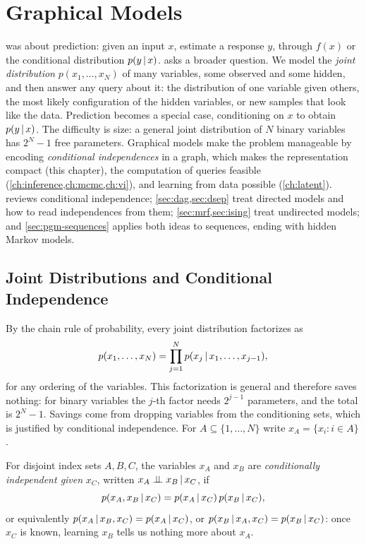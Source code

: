 \chapter{Graphical Models}\label{ch:pgm}

 was about prediction: given an input $x$, estimate a response $y$, through $f(x)$ or the conditional distribution $p(y\,|\, x)$.  asks a broader question. We model the \emph{joint distribution} $p(x_1,\dots,x_N)$ of many variables, some observed and some hidden, and then answer any query about it: the distribution of one variable given others, the most likely configuration of the hidden variables, or new samples that look like the data. Prediction becomes a special case, conditioning on $x$ to obtain $p(y\,|\, x)$. The difficulty is size: a general joint distribution of $N$ binary variables has $2^N-1$ free parameters. Graphical models make the problem manageable by encoding \emph{conditional independences} in a graph, which makes the representation compact (this chapter), the computation of queries feasible (\cref{ch:inference,ch:mcmc,ch:vi}), and learning from data possible (\cref{ch:latent}).  reviews conditional independence; \cref{sec:dag,sec:dsep} treat directed models and how to read independences from them; \cref{sec:mrf,sec:ising} treat undirected models; and \cref{sec:pgm-sequences} applies both ideas to sequences, ending with hidden Markov models.

\section{Joint Distributions and Conditional Independence}\label{sec:pgm-joint}

By the chain rule of probability, every joint distribution factorizes as
\[
p(x_1,\dots,x_N)=\prod_{j=1}^Np(x_j\,|\, x_1,\dots,x_{j-1}),
\]
for any ordering of the variables. This factorization is general and therefore saves nothing: for binary variables the $j$-th factor needs $2^{j-1}$ parameters, and the total is $2^N-1$. Savings come from dropping variables from the conditioning sets, which is justified by conditional independence. For $A\subseteq\{1,\dots,N\}$ write $x_A=\{x_i:i\in A\}$.

\begin{definition}\label{def:cond-indep}
For disjoint index sets $A,B,C$, the variables $x_A$ and $x_B$ are \emph{conditionally independent given} $x_C$, written $x_A\perp\!\!\!\perp x_B\,|\, x_C$, if
\[
p(x_A,x_B\,|\, x_C)=p(x_A\,|\, x_C)\,p(x_B\,|\, x_C),
\]
or equivalently $p(x_A\,|\, x_B,x_C)=p(x_A\,|\, x_C)$, or $p(x_B\,|\, x_A,x_C)=p(x_B\,|\, x_C)$: once $x_C$ is known, learning $x_B$ tells us nothing more about $x_A$.
\end{definition}

